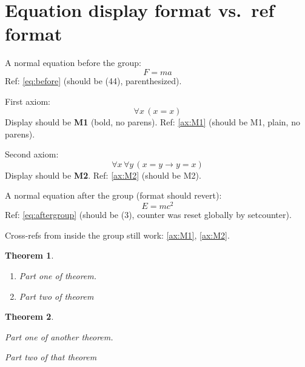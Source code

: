 \documentclass[leqno]{article}
\newtheorem{theorem}{Theorem}
\begin{document}
\section{Equation display format vs.\ ref format}

A normal equation before the group:
\begin{equation}
  F = ma \label{eq:before}
\end{equation}
Ref: \ref{eq:before} (should be (44), parenthesized).

\begingroup
{}
\setcounter{equation}{0}

First axiom:
\begin{equation}
  \forall x\, (x = x) \label{ax:M1}
\end{equation}
Display should be \textbf{M1} (bold, no parens).
Ref: \ref{ax:M1} (should be M1, plain, no parens).

Second axiom:
\begin{equation}
  \forall x\, \forall y\, (x = y \to y = x) \label{ax:M2}
\end{equation}
Display should be \textbf{M2}.
Ref: \ref{ax:M2} (should be M2).
\endgroup

A normal equation after the group (format should revert):
\begin{equation}
  E = mc^2 \label{eq:aftergroup}
\end{equation}
Ref: \ref{eq:aftergroup} (should be (3), counter was reset globally by setcounter).

Cross-refs from inside the group still work: \ref{ax:M1}, \ref{ax:M2}.

\begin{theorem}
    \begin{enumerate}
        \item 
        Part one of theorem.
        \item
        Part two of theorem
    \end{enumerate}
\end{theorem}

\begin{theorem}
    \begin{prop}
        \item[style=roman] 
        Part one of another theorem.
        \item[style=roman]
        Part two of that theorem
    \end{prop}
\end{theorem}
\end{document}
